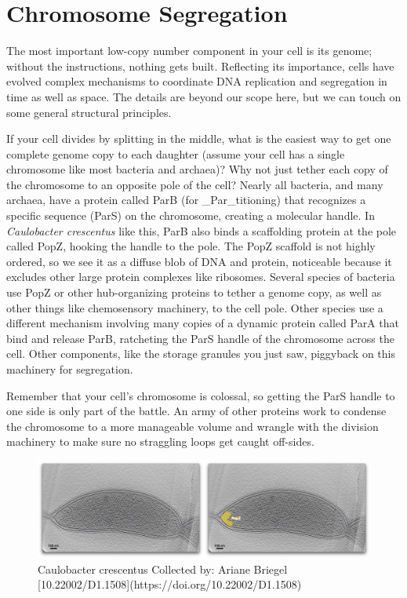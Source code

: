 \documentclass[]{tufte-book}
\begin{document}
\section{Chromosome Segregation}\label{chromosome-segregation}

The most important low-copy number component in your cell is its genome;
without the instructions, nothing gets built. Reflecting its importance,
cells have evolved complex mechanisms to coordinate DNA replication and
segregation in time as well as space. The details are beyond our scope
here, but we can touch on some general structural principles.

If your cell divides by splitting in the middle, what is the easiest way
to get one complete genome copy to each daughter (assume your cell has a
single chromosome like most bacteria and archaea)? Why not just tether
each copy of the chromosome to an opposite pole of the cell? Nearly all
bacteria, and many archaea, have a protein called ParB (for
\_Par\_titioning) that recognizes a specific sequence (ParS) on the
chromosome, creating a molecular handle. In \emph{Caulobacter
crescentus} like this, ParB also binds a scaffolding protein at the pole
called PopZ, hooking the handle to the pole. The PopZ scaffold is not
highly ordered, so we see it as a diffuse blob of DNA and protein,
noticeable because it excludes other large protein complexes like
ribosomes. Several species of bacteria use PopZ or other hub-organizing
proteins to tether a genome copy, as well as other things like
chemosensory machinery, to the cell pole. Other species use a different
mechanism involving many copies of a dynamic protein called ParA that
bind and release ParB, ratcheting the ParS handle of the chromosome
across the cell. Other components, like the storage granules you just
saw, piggyback on this machinery for segregation.

Remember that your cell's chromosome is colossal, so getting the ParS
handle to one side is only part of the battle. An army of other proteins
work to condense the chromosome to a more manageable volume and wrangle
with the division machinery to make sure no straggling loops get caught
off-sides.

\begin{figure}
\includegraphics{movie_stills/5_2} \caption[Caulobacter crescentus Collected by]{Caulobacter crescentus Collected by: Ariane Briegel [10.22002/D1.1508](https://doi.org/10.22002/D1.1508)}\label{fig:unnamed-chunk-81}
\end{figure}
\end{document}
